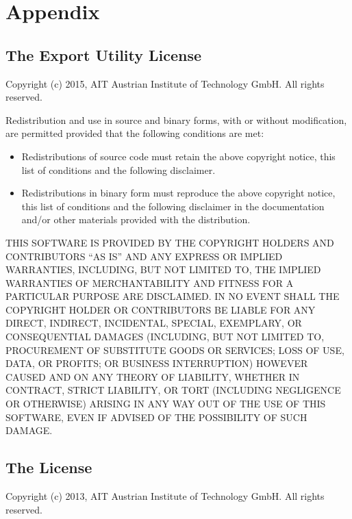 \chapter{Appendix}

\section{The \fmipp \trnsys Export Utility License}
\label{trnsys_fmu_license}

Copyright (c) 2015, AIT Austrian Institute of Technology GmbH. All
rights reserved.

Redistribution and use in source and binary forms, with or without
modification, are permitted provided that the following conditions are
met:

\begin{itemize}
\itemsep1pt\parskip0pt
\item
  Redistributions of source code must retain the above copyright notice,
  this list of conditions and the following disclaimer.
\item
  Redistributions in binary form must reproduce the above copyright
  notice, this list of conditions and the following disclaimer in the
  documentation and/or other materials provided with the distribution.
\end{itemize}

THIS SOFTWARE IS PROVIDED BY THE COPYRIGHT HOLDERS AND CONTRIBUTORS ``AS
IS'' AND ANY EXPRESS OR IMPLIED WARRANTIES, INCLUDING, BUT NOT LIMITED
TO, THE IMPLIED WARRANTIES OF MERCHANTABILITY AND FITNESS FOR A
PARTICULAR PURPOSE ARE DISCLAIMED. IN NO EVENT SHALL THE COPYRIGHT
HOLDER OR CONTRIBUTORS BE LIABLE FOR ANY DIRECT, INDIRECT, INCIDENTAL,
SPECIAL, EXEMPLARY, OR CONSEQUENTIAL DAMAGES (INCLUDING, BUT NOT LIMITED
TO, PROCUREMENT OF SUBSTITUTE GOODS OR SERVICES; LOSS OF USE, DATA, OR
PROFITS; OR BUSINESS INTERRUPTION) HOWEVER CAUSED AND ON ANY THEORY OF
LIABILITY, WHETHER IN CONTRACT, STRICT LIABILITY, OR TORT (INCLUDING
NEGLIGENCE OR OTHERWISE) ARISING IN ANY WAY OUT OF THE USE OF THIS
SOFTWARE, EVEN IF ADVISED OF THE POSSIBILITY OF SUCH DAMAGE.


\section{The \fmipp License}
\label{fmipp_license}

Copyright (c) 2013, AIT Austrian Institute of Technology GmbH. All
rights reserved.

